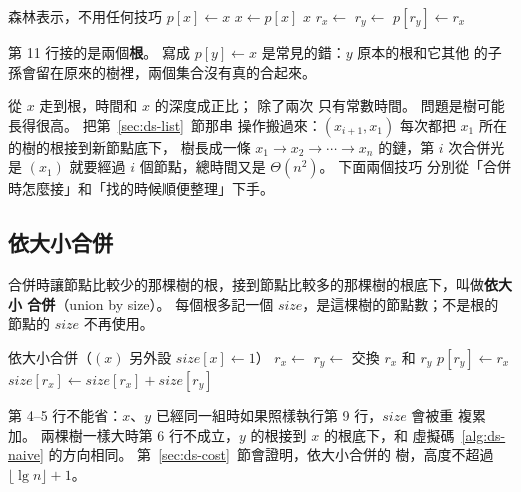 \begin{pseudo}[label=alg:ds-naive, unbreakable]{森林表示，不用任何技巧}
    \State $p[x] \gets x$
\EndProcedure
{}
        \State $x \gets p[x]$
    \EndWhile
    \State \Return $x$
\EndFunction
{}
    \State $r_x \gets$ 
    \State $r_y \gets$ 
        \State $p[r_y] \gets r_x$ 
    \EndIf
\EndProcedure
\end{pseudo}

第 11 行接的是兩個\textbf{根}。 寫成 $p[y] \gets x$ 是常見的錯：$y$ 原本的根和它其他
的子孫會留在原來的樹裡，兩個集合沒有真的合起來。

 從 $x$ 走到根，時間和 $x$ 的深度成正比； 除了兩次
 只有常數時間。 問題是樹可能長得很高。 把第~\ref{sec:ds-list}~節那串
操作搬過來：$(x_{i+1}, x_1)$ 每次都把 $x_1$ 所在的樹的根接到新節點底下，
樹長成一條 $x_1 \to x_2 \to \cdots \to x_n$ 的鏈，第 $i$ 次合併光是
$(x_1)$ 就要經過 $i$ 個節點，總時間又是 $\Theta(n^2)$。 下面兩個技巧
分別從「合併時怎麼接」和「找的時候順便整理」下手。

\subsection{依大小合併}
\label{sec:ds-size}

合併時讓節點比較少的那棵樹的根，接到節點比較多的那棵樹的根底下，叫做\textbf{依大小
合併}（union by size）。 每個根多記一個 $\mathit{size}$，是這棵樹的節點數；不是根的
節點的 $\mathit{size}$ 不再使用。

\begin{pseudo}[label=alg:ds-size]{依大小合併（$(x)$ 另外設 $\mathit{size}[x] \gets 1$）}
    \State $r_x \gets$ 
    \State $r_y \gets$ 
        \State \Return
    \EndIf
        \State 交換 $r_x$ 和 $r_y$ 
    \EndIf
    \State $p[r_y] \gets r_x$
    \State $\mathit{size}[r_x] \gets \mathit{size}[r_x] + \mathit{size}[r_y]$
\EndProcedure
\end{pseudo}

第 4--5 行不能省：$x$、$y$ 已經同一組時如果照樣執行第 9 行，$\mathit{size}$ 會被重
複累加。 兩棵樹一樣大時第 6 行不成立，$y$ 的根接到 $x$ 的根底下，和
虛擬碼~\ref{alg:ds-naive} 的方向相同。 第~\ref{sec:ds-cost}~節會證明，依大小合併的
樹，高度不超過 $\lfloor \lg n \rfloor + 1$。

